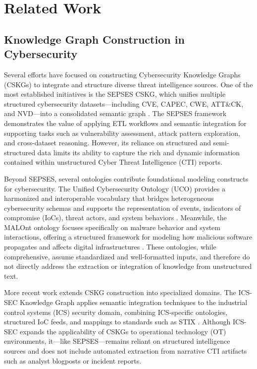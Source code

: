 \section{Related Work}

\subsection{Knowledge Graph Construction in Cybersecurity}

Several efforts have focused on constructing Cybersecurity Knowledge Graphs (CSKGs) to integrate and structure diverse threat intelligence sources. One of the most established initiatives is the SEPSES CSKG, which unifies multiple structured cybersecurity datasets—including CVE, CAPEC, CWE, ATT\&CK, and NVD—into a consolidated semantic graph \cite{Kiesling2019SEPSES}. The SEPSES framework demonstrates the value of applying ETL workflows and semantic integration for supporting tasks such as vulnerability assessment, attack pattern exploration, and cross-dataset reasoning. However, its reliance on structured and semi-structured data limits its ability to capture the rich and dynamic information contained within unstructured Cyber Threat Intelligence (CTI) reports.

Beyond SEPSES, several ontologies contribute foundational modeling constructs for cybersecurity. The Unified Cybersecurity Ontology (UCO) provides a harmonized and interoperable vocabulary that bridges heterogeneous cybersecurity schemas and supports the representation of events, indicators of compromise (IoCs), threat actors, and system behaviors \cite{UCOCommunity}. Meanwhile, the MALOnt ontology focuses specifically on malware behavior and system interactions, offering a structured framework for modeling how malicious software propagates and affects digital infrastructures \cite{Rastogi2020MALOnt}. These ontologies, while comprehensive, assume standardized and well-formatted inputs, and therefore do not directly address the extraction or integration of knowledge from unstructured text.

More recent work extends CSKG construction into specialized domains. The ICS-SEC Knowledge Graph applies semantic integration techniques to the industrial control systems (ICS) security domain, combining ICS-specific ontologies, structured IoC feeds, and mappings to standards such as STIX \cite{Kurniawan2024ICSSEC}. Although ICS-SEC expands the applicability of CSKGs to operational technology (OT) environments, it—like SEPSES—remains reliant on structured intelligence sources and does not include automated extraction from narrative CTI artifacts such as analyst blogposts or incident reports.

